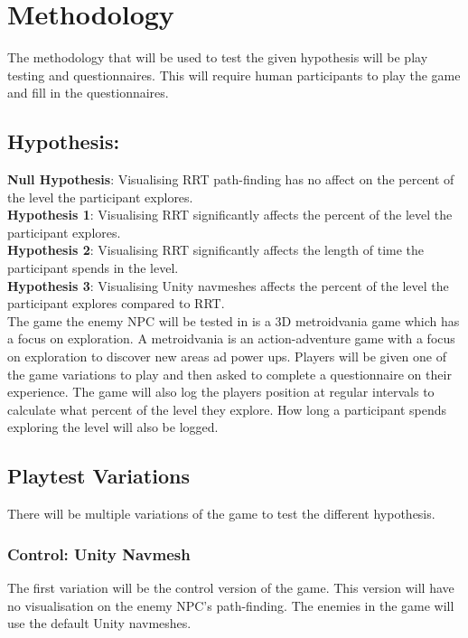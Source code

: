 \documentclass[journal]{IEEEtran}
\begin{document}
\section{Methodology}
The methodology that will be used to test the given hypothesis will be play testing and questionnaires. This will require human participants to play the game and fill in the questionnaires. 

\subsection{Hypothesis:}
\textbf{Null Hypothesis}: Visualising RRT path-finding has no affect on the percent of the level the participant explores. \\
\textbf{Hypothesis 1}: Visualising RRT significantly affects the percent of the level the participant explores. \\
\textbf{Hypothesis 2}: Visualising RRT significantly affects the length of time the participant spends in the level. \\
\textbf{Hypothesis 3}:  Visualising Unity navmeshes affects the percent of the level the participant explores compared to RRT. \\


The game the enemy NPC will be tested in is a 3D metroidvania game which has a focus on exploration. A metroidvania is an action-adventure game with a focus on exploration to discover new areas ad power ups. Players will be given one of the game variations to play and then asked to complete a questionnaire on their experience. The game will also log the players position at regular intervals to calculate what percent of the level they explore. How long a participant spends exploring the level will also be logged.
  

\subsection{Playtest Variations}
There will be multiple variations of the game to test the different hypothesis. 

\subsubsection{Control: Unity Navmesh}
The first variation will be the control version of the game. This version will have no visualisation on the enemy NPC's path-finding. The enemies in the game will use the default Unity navmeshes.
\end{document}
